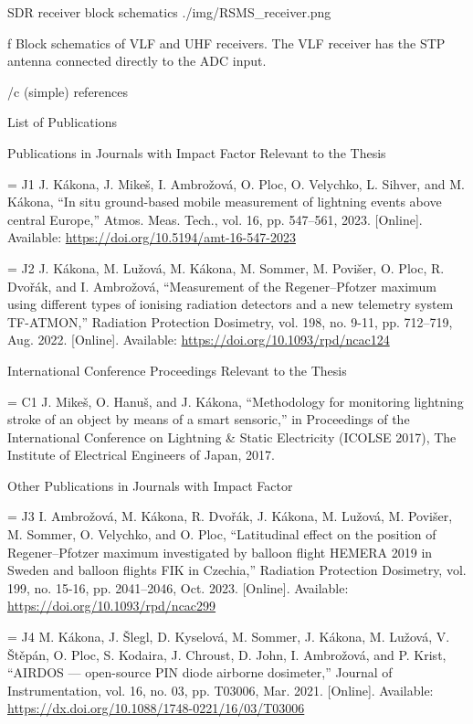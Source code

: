  SDR receiver block schematics
\medskip
\picw=8cm \cinspic ./img/RSMS_receiver.png
\caption/f Block schematics of VLF and UHF receivers. The VLF receiver has the STP antenna connected directly to the ADC input. 
\medskip



\bibchap

\usebib/c (simple) references

\app List of Publications

\specialbibs


\secc Publications in Journals with Impact Factor Relevant to the Thesis

\bib[j1] = {J1} J. Kákona, J. Mikeš, I. Ambrožová, O. Ploc, O. Velychko, L. Sihver, and M. Kákona, “In situ ground-based mobile measurement of lightning events above central Europe,” Atmos. Meas. Tech., vol. 16, pp. 547–561, 2023. [Online]. Available: \url{https://doi.org/10.5194/amt-16-547-2023}

\bib[j2] = {J2} J. Kákona, M. Lužová, M. Kákona, M. Sommer, M. Povišer, O. Ploc, R. Dvořák, and I. Ambrožová, “Measurement of the Regener–Pfotzer maximum using different types of ionising radiation detectors and a new telemetry system TF-ATMON,” Radiation Protection Dosimetry, vol. 198, no. 9-11, pp. 712–719, Aug. 2022. [Online]. Available: \url{https://doi.org/10.1093/rpd/ncac124}

\secc International Conference Proceedings Relevant to the Thesis

\bib[c1] = {C1} J. Mikeš, O. Hanuš, and J. Kákona, “Methodology for monitoring lightning stroke of an object by means of a smart sensoric,” in Proceedings of the International Conference on Lightning \& Static Electricity (ICOLSE 2017), The Institute of Electrical Engineers of Japan, 2017.

\secc Other Publications in Journals with Impact Factor

\bib[j3] = {J3} I. Ambrožová, M. Kákona, R. Dvořák, J. Kákona, M. Lužová, M. Povišer, M. Sommer, O. Velychko, and O. Ploc, “Latitudinal effect on the position of Regener–Pfotzer maximum investigated by balloon flight HEMERA 2019 in Sweden and balloon flights FIK in Czechia,” Radiation Protection Dosimetry, vol. 199, no. 15-16, pp. 2041–2046, Oct. 2023. [Online]. Available: \url{https://doi.org/10.1093/rpd/ncac299}

\bib[j4] = {J4} M. Kákona, J. Šlegl, D. Kyselová, M. Sommer, J. Kákona, M. Lužová, V. Štěpán, O. Ploc, S. Kodaira, J. Chroust, D. John, I. Ambrožová, and P. Krist, “AIRDOS — open-source PIN diode airborne dosimeter,” Journal of Instrumentation, vol. 16, no. 03, pp. T03006, Mar. 2021. [Online]. Available: \url{https://dx.doi.org/10.1088/1748-0221/16/03/T03006}

